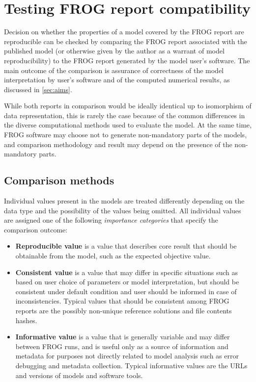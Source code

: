 \chapter{Testing FROG report compatibility}
\label{chap:test}

Decision on whether the properties of a model covered by the FROG report are reproducible can be checked by comparing the FROG report associated with the published model (or otherwise given by the author as a warrant of model reproducibility) to the FROG report generated by the model user's software. The main outcome of the comparison is assurance of correctness of the model interpretation by user's software and of the computed numerical results, as discussed in \cref{sec:aims}.

While both reports in comparison would be ideally identical up to isomorphism of data representation, this is rarely the case because of the common differences in the diverse computational methods used to evaluate the model. At the same time, FROG software may choose not to generate non-mandatory parts of the models, and comparison methodology and result may depend on the presence of the non-mandatory parts.

\section{Comparison methods}

Individual values present in the models are treated differently depending on the data type and the possibility of the values being omitted. All individual values are assigned one of the following \emph{importance categories} that specify the comparison outcome:
\begin{itemize}
\item \textbf{Reproducible value} is a value that describes core result that should be obtainable from the model, such as the expected objective value.
\item \textbf{Consistent value} is a value that may differ in specific situations such as based on user choice of parameters or model interpretation, but should be consistent under default condition and user should be informed in case of inconsistencies. Typical values that should be consistent among FROG reports are the possibly non-unique reference solutions and file contents hashes.
\item \textbf{Informative value} is a value that is generally variable and may differ between FROG runs, and is useful only as a source of information and metadata for purposes not directly related to model analysis such as error debugging and metadata collection. Typical informative values are the URLs and versions of models and software tools.
\end{itemize}

